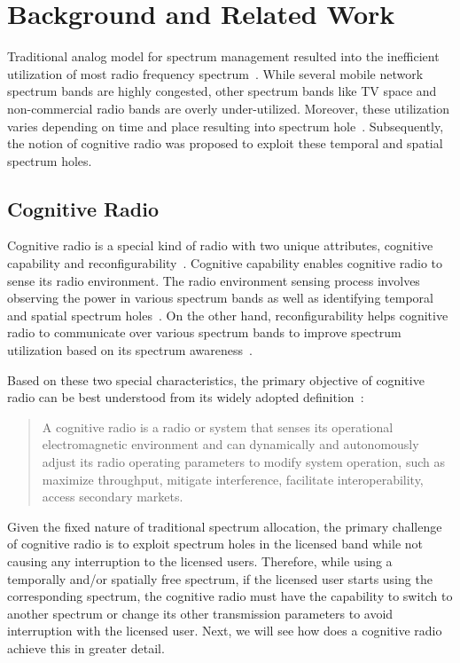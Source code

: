 \chapter{Background and Related Work}\label{relatedWork}

Traditional analog model for spectrum management resulted into the inefficient utilization of most radio frequency spectrum~\cite{valenta2010survey}. While several mobile network spectrum bands are highly congested, other spectrum bands like TV space and non-commercial radio bands are overly under-utilized. Moreover, these utilization varies depending on time and place resulting into spectrum hole~\cite{tandra2009spectrum}. Subsequently, the notion of cognitive radio was proposed to exploit these temporal and spatial spectrum holes.

\section{Cognitive Radio}
Cognitive radio is a special kind of radio with two unique attributes, cognitive capability and reconfigurability~\cite{akyildiz2006next, thomas2005cognitive, haykin2005cognitive}. Cognitive capability enables cognitive radio to sense its radio environment. The radio environment sensing process involves observing the power in various spectrum bands as well as identifying temporal and spatial spectrum holes~\cite{akyildiz2006next}. On the other hand, reconfigurability helps cognitive radio to communicate over various spectrum bands to improve spectrum utilization based on its spectrum awareness~\cite{jondral2005software}.

Based on these two special characteristics, the primary objective of cognitive radio can be best understood from its widely adopted definition~\cite{federal2005notice}:

\begin{quote}
A cognitive radio is a radio or system that senses its operational electromagnetic environment and can dynamically and autonomously adjust its radio operating parameters to modify system operation, such as maximize throughput, mitigate interference, facilitate interoperability, access secondary markets.
\end{quote}

Given the fixed nature of traditional spectrum allocation, the primary challenge of cognitive radio is to exploit spectrum holes in the licensed band while not causing any interruption to the licensed users. Therefore, while using a temporally and/or spatially free spectrum, if the licensed user starts using the corresponding spectrum, the cognitive radio must have the capability to switch to another spectrum or change its other transmission parameters to avoid interruption with the licensed user. Next, we will see how does a cognitive radio achieve this in greater detail.

